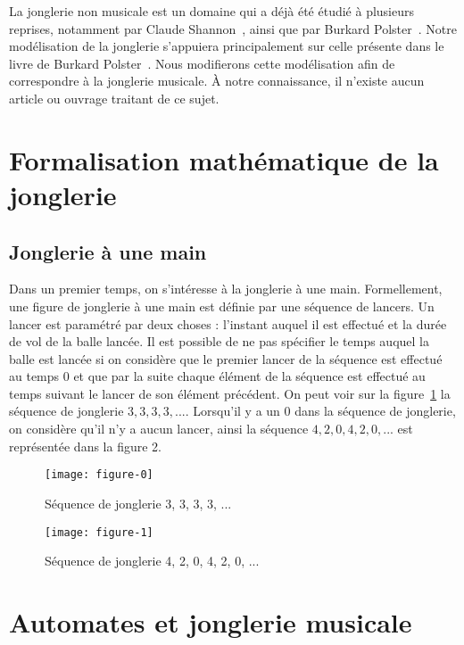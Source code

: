 \documentclass[a4paper]{easychair}
\begin{document}
La jonglerie non musicale est un domaine qui a déjà été étudié à plusieurs
reprises, notamment par Claude Shannon~\cite{shannon}, ainsi que par Burkard
Polster~\cite{polster}. Notre modélisation de la jonglerie s'appuiera
principalement sur celle présente dans le livre de Burkard
Polster~\cite{polster}. Nous modifierons cette modélisation afin de correspondre
à la jonglerie musicale. À notre connaissance, il n'existe aucun article ou
ouvrage traitant de ce sujet.

\section{Formalisation mathématique de la jonglerie}
\subsection{Jonglerie à une main}
Dans un premier temps, on s'intéresse à la jonglerie à une main. Formellement,
une figure de jonglerie à une main est définie par une séquence de lancers. Un
lancer est paramétré par deux choses : l'instant auquel il est effectué et la
durée de vol de la balle lancée. Il est possible de ne pas spécifier le temps
auquel la balle est lancée si on considère que le premier lancer de la séquence
est effectué au temps $0$ et que par la suite chaque élément de la séquence est
effectué au temps suivant le lancer de son élément précédent. On peut voir sur
la figure~\ref{fig1} la séquence de jonglerie $3, 3, 3, 3, ...$. Lorsqu'il y a
un $0$ dans la séquence de jonglerie, on considère qu'il n'y a aucun lancer,
ainsi la séquence $4, 2, 0, 4, 2, 0, ...$ est représentée dans la figure 2.

\begin{figure}[!h]
  \centering
  \texttt{[image: figure-0]}

  \caption{Séquence de jonglerie 3, 3, 3, 3, ...}
  \label{fig1}
\end{figure}

\begin{figure}[!h]
  \centering
  \texttt{[image: figure-1]}

  \caption{Séquence de jonglerie 4, 2, 0, 4, 2, 0, ...}
  \label{fig2}
\end{figure}



\section{Automates et jonglerie musicale}
\end{document}
